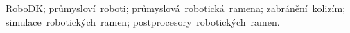 ﻿%
RoboDK; průmysloví~roboti; průmyslová~robotická~ramena; \newline zabránění~kolizím; simulace~robotických~ramen; postprocesory~robotických~ramen.


